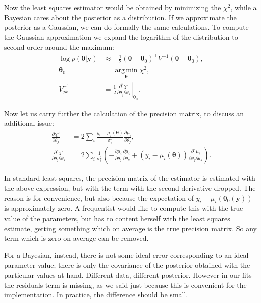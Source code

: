 Now the least squares estimator would be obtained by minimizing the $\chi^2$,
while a Bayesian cares about the posterior as a distribution. If we approximate
the posterior as a Gaussian, we can do formally the same calculations. To
compute the Gaussian approximation we expand the logarithm of the distribution
to second order around the maximum:
%
\begin{align}
    \log p(\boldsymbol\theta|\mathbf y) &\approx
    -\frac 12 (\boldsymbol\theta-\boldsymbol\theta_0)^\top
    V^{-1} (\boldsymbol\theta-\boldsymbol\theta_0), \\
    \boldsymbol\theta_0
    &= \operatorname*{arg\,min}_{\boldsymbol\theta} \chi^2, \\
    V^{-1}_{jk} &= \frac12 \left.
    \frac {\partial^2 \chi^2} {\partial\theta_j \partial\theta_k}
    \right|_{\boldsymbol\theta_0}. \label{eq:lsqpm}
\end{align}

Now let us carry further the calculation of the precision matrix, to discuss
an additional issue:
%
\begin{align}
    \frac{\partial\chi^2}{\partial\theta_j} &=
    2 \sum_i \frac {y_i - \mu_i(\boldsymbol\theta)} {\sigma_i^2}
    \frac {\partial\mu_i} {\partial\theta_j}, \\
    \frac {\partial^2 \chi^2} {\partial\theta_j \partial\theta_k} &=
    2 \sum_i \frac1{\sigma_i^2} \left(
    -\frac {\partial\mu_i} {\partial\theta_j}
    \frac {\partial\mu_i} {\partial\theta_k}
    + (y_i - \mu_i(\boldsymbol\theta))
    \frac {\partial^2 \mu_i} {\partial\theta_j \partial\theta_k}
    \right). \label{eq:lsqhess}
\end{align}

In standard least squares, the precision matrix of the estimator is estimated
with the above expression, but with the term with the second derivative
dropped. The reason is for convenience, but also because the expectation of
$y_i - \mu_i(\boldsymbol\theta_0(\mathbf y))$ is approximately zero. A
frequentist would like to compute this with the true value of the parameters,
but has to content herself with the least squares estimate, getting something
which on average is the true precision matrix. So any term which is zero on
average can be removed.

For a Bayesian, instead, there is not some ideal error corresponding to an
ideal parameter value; there is only the covariance of the posterior obtained
with the particular values at hand. Different data, different posterior.
However in our fits the residuals term is missing, as we said just because this
is convenient for the implementation. In practice, the difference should be
small.

